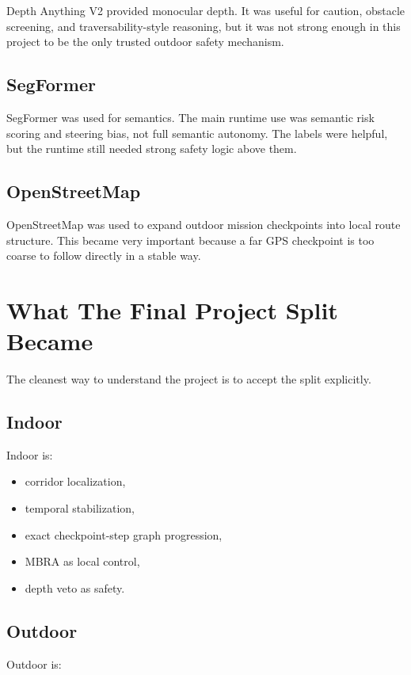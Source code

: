 \documentclass[11pt]{article}
\begin{document}
Depth Anything V2 provided monocular depth. It was useful for caution, obstacle
screening, and traversability-style reasoning, but it was not strong enough in this
project to be the only trusted outdoor safety mechanism.

\subsection{SegFormer}

SegFormer was used for semantics. The main runtime use was semantic risk scoring and
steering bias, not full semantic autonomy. The labels were helpful, but the runtime
still needed strong safety logic above them.

\subsection{OpenStreetMap}

OpenStreetMap was used to expand outdoor mission checkpoints into local route
structure. This became very important because a far GPS checkpoint is too coarse to
follow directly in a stable way.

\section{What The Final Project Split Became}

The cleanest way to understand the project is to accept the split explicitly.

\subsection{Indoor}

Indoor is:

\begin{itemize}[nosep]
  \item corridor localization,
  \item temporal stabilization,
  \item exact checkpoint-step graph progression,
  \item MBRA as local control,
  \item depth veto as safety.
\end{itemize}

\subsection{Outdoor}

Outdoor is:
\end{document}
